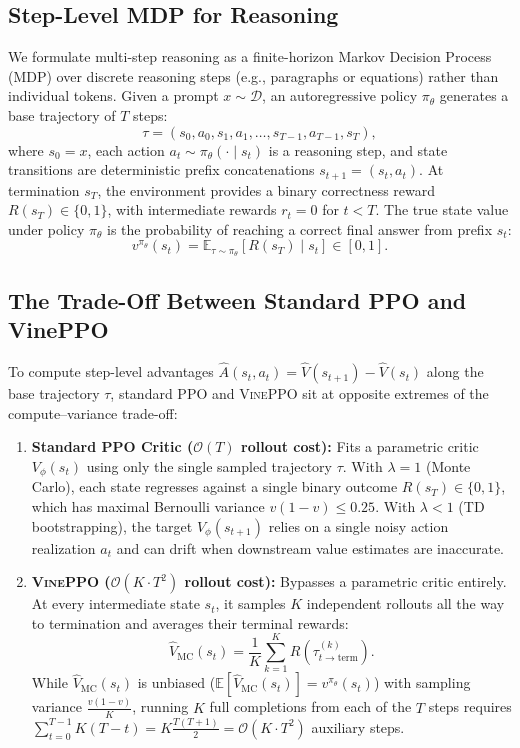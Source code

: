 \documentclass[11pt,a4paper]{article}
\newcommand{\E}{\mathbb{E}}
\newcommand{\Vmc}{\hat{V}_{\text{MC}}}
\begin{document}
\subsection{Step-Level MDP for Reasoning}
We formulate multi-step reasoning as a finite-horizon Markov Decision Process (MDP) over discrete reasoning steps (e.g., paragraphs or equations) rather than individual tokens. Given a prompt $x \sim \mathcal{D}$, an autoregressive policy $\pi_\theta$ generates a base trajectory of $T$ steps:
\begin{equation}
    \tau = (s_0, a_0, s_1, a_1, \dots, s_{T-1}, a_{T-1}, s_T),
\end{equation}
where $s_0 = x$, each action $a_t \sim \pi_\theta(\cdot \mid s_t)$ is a reasoning step, and state transitions are deterministic prefix concatenations $s_{t+1} = (s_t, a_t)$. At termination $s_T$, the environment provides a binary correctness reward $R(s_T) \in \{0, 1\}$, with intermediate rewards $r_t = 0$ for $t < T$. The true state value under policy $\pi_\theta$ is the probability of reaching a correct final answer from prefix $s_t$:
\begin{equation}
    v^{\pi_\theta}(s_t) = \E_{\tau \sim \pi_\theta}\!\left[ R(s_T) \mid s_t \right] \in [0, 1].
\end{equation}

\subsection{The Trade-Off Between Standard PPO and VinePPO}
To compute step-level advantages $\hat{A}(s_t, a_t) = \hat{V}(s_{t+1}) - \hat{V}(s_t)$ along the base trajectory $\tau$, standard PPO and \textsc{VinePPO} sit at opposite extremes of the compute--variance trade-off:
\begin{enumerate}
    \item \textbf{Standard PPO Critic ($\mathcal{O}(T)$ rollout cost):} Fits a parametric critic $V_\phi(s_t)$ using only the single sampled trajectory $\tau$. With $\lambda = 1$ (Monte Carlo), each state regresses against a single binary outcome $R(s_T) \in \{0, 1\}$, which has maximal Bernoulli variance $v(1-v) \le 0.25$. With $\lambda < 1$ (TD bootstrapping), the target $V_\phi(s_{t+1})$ relies on a single noisy action realization $a_t$ and can drift when downstream value estimates are inaccurate.
    \item \textbf{\textsc{VinePPO} ($\mathcal{O}(K \cdot T^2)$ rollout cost):} Bypasses a parametric critic entirely. At every intermediate state $s_t$, it samples $K$ independent rollouts all the way to termination and averages their terminal rewards:
    \begin{equation}
        \Vmc(s_t) = \frac{1}{K} \sum_{k=1}^K R\!\left(\tau_{t \to \text{term}}^{(k)}\right).
        \label{eq:vmc}
    \end{equation}
    While $\Vmc(s_t)$ is unbiased ($\E[\Vmc(s_t)] = v^{\pi_\theta}(s_t)$) with sampling variance $\frac{v(1-v)}{K}$, running $K$ full completions from each of the $T$ steps requires $\sum_{t=0}^{T-1} K(T - t) = K\frac{T(T+1)}{2} = \mathcal{O}(K \cdot T^2)$ auxiliary steps.
\end{enumerate}
\end{document}
